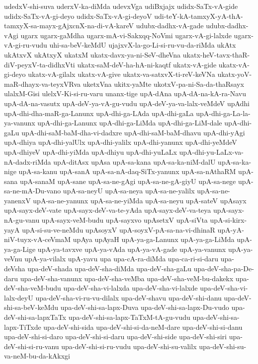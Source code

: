 {udedxV-shi-suva
uderxV-ka-diMda
udevxVga
udiBxjajx
udidx-SaTx-vA-gide
udidx-SaTx-vA-gi-deyo
udidx-SaTx-vA-gi-deyoV
udi-teY-kA-tamxyX-yA-thA-tamxyX-sa-mayx-gAjxcnX-na-di-vA-kareV
udubx-dadhx-vA-gade
udubx-dadhx-vAgi
ugarx
ugarx-gaMdha
ugarx-mA-vi-Sakxqq-NoVmi
ugarx-vA-gi-lalxde
ugarx-vA-gi-ru-vudu
uhi-sa-beV-keMdU
ujajxvX-la-go-Li-si-ru-vu-da-riMda
ukAtx
ukAtxvX
ukAtxyX
ukatxM
ukatx-davx-ya-ni-SeV-dheVna
ukatx-heV-tavx-thaR-diV-peyxV-ta-didhxVti
ukatx-saM-deV-ha-hA-ni-kaqtf
ukatx-vA-gide
ukatx-vA-gi-deyo
ukatx-vA-gilalx
ukatx-vA-give
ukatx-va-satxvX-ti-reV-keVNa
ukatx-yoV-maR-dhayx-va-teyxVRva
uketxVna
ukitx-yaMte
ukotxV-pa-ni-Sa-da-thaRsayx
ulalxM-Gisi
ulelxV-Ki-si-ru-varu
unanx-tige
upA-dAna
upA-dA-na-kA-ra-Navu
upA-dA-na-vasutx
upA-deV-ya-vA-gu-vudu
upA-deV-ya-va-lalx-veMdeV
upAdhi
upA-dhi-dha-maR-ga-Lanunx
upA-dhi-ga-LAda
upA-dhi-gaLa
upA-dhi-ga-La-la-ya-vanunx
upA-dhi-ga-Lanunx
upA-dhi-ga-LiMda
upA-dhi-ga-LiM-dale
upA-dhi-gaLu
upA-dhi-saM-baM-dha-vi-dadxre
upA-dhi-saM-baM-dhavu
upA-dhi-yAgi
upA-dhiya
upA-dhi-yalUlx
upA-dhi-yalilx
upA-dhi-yanunx
upA-dhi-yeMdeV
upA-dhiyeV
upA-dhi-yiMda
upA-dhiyu
upA-dhi-yuLaLx
upA-dhi-yu-LaLx-va-nA-dadx-riMda
upA-ditAsx
upAsa
upA-sa-kana
upA-sa-ka-niM-dalU
upA-sa-ka-nige
upA-sa-kanu
upA-sanA
upA-sa-nA-daq-SiTx-yanunx
upA-sa-nAthaRM
upA-sana
upA-sanaM
upA-sane
upA-sa-ne-gAgi
upA-sa-ne-gA-giyU
upA-sa-nege
upA-sa-ne-mA-Du-vano
upA-sa-neyU
upA-sa-neya
upA-sa-ne-yalilx
upA-sa-ne-yanenxV
upA-sa-ne-yanunx
upA-sa-ne-yiMda
upA-sa-neyu
upA-sateV
upAsayx
upA-sayx-deV-vate
upA-sayx-deV-va-te-yAda
upA-sayx-deV-va-teya
upA-sayx-nA-gu-vanu
upA-sayx-veM-budu
upA-sayxvo
upAsetxV
upA-siVta
upA-si-kirx-yayA
upA-si-su-ve-neMdu
upAsoyxV
upA-soyxV-pA-sa-na-vi-dhinaR
upA-yA-niV-tuyx-vA-ceVmaM
upAya
upAyaH
upA-ya-ga-Lanunx
upA-ya-ga-LiMda
upA-ya-ga-Lige
upA-ya-tavxve
upA-ya-vAda
upA-ya-vA-gade
upA-ya-vanunx
upA-ya-veVnu
upA-ya-vilalx
upA-yavu
upa
upa-cA-ra-diMda
upa-ca-ri-si-daru
upa-deVsha
upa-deV-shada
upa-deV-sha-diMda
upa-deV-sha-gaLu
upa-deV-sha-pa-De-daru
upa-deV-sha-vanunx
upa-deV-sha-veMba
upa-deV-sha-veM-bu-dakekx
upa-deV-sha-veM-budu
upa-deV-sha-vi-lalxda
upa-deV-sha-vi-lalxde
upa-deV-sha-vi-lalx-deyU
upa-deV-sha-vi-ru-vu-dilalx
upa-deV-shavu
upa-deV-shi-danu
upa-deV-shi-sa-beV-keMdu
upa-deV-shi-sa-lapx-Duva
upa-deV-shi-sa-lapx-Du-vudo
upa-deV-shi-sa-lapxTaTx
upa-deV-shi-sa-lapx-TaTxM-tA-gu-vudu
upa-deV-shi-sa-lapx-TiTxde
upa-deV-shi-sida
upa-deV-shi-si-da-neM-dare
upa-deV-shi-si-danu
upa-deV-shi-si-daro
upa-deV-shi-si-daru
upa-deV-shi-side
upa-deV-shi-siri
upa-deV-shi-si-ru-vanu
upa-deV-shi-si-ru-vudu
upa-deV-shi-su-valilx
upa-deV-shi-su-va-neM-bu-da-kAkxgi
}

